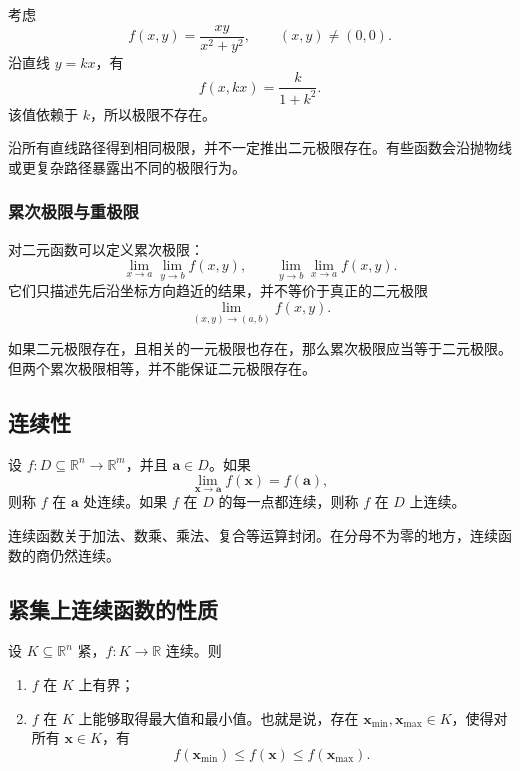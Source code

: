 \begin{example}
考虑
\[
    f(x,y)=\frac{xy}{x^2+y^2},\qquad (x,y)\neq(0,0).
\]
沿直线 $y=kx$，有
\[
    f(x,kx)=\frac{k}{1+k^2}.
\]
该值依赖于 $k$，所以极限不存在。
\end{example}

\begin{remark}
沿所有直线路径得到相同极限，并不一定推出二元极限存在。有些函数会沿抛物线或更复杂路径暴露出不同的极限行为。
\end{remark}

\subsubsection{累次极限与重极限}

对二元函数可以定义累次极限：
\[
    \lim_{x\to a}\lim_{y\to b}f(x,y),
    \qquad
    \lim_{y\to b}\lim_{x\to a}f(x,y).
\]
它们只描述先后沿坐标方向趋近的结果，并不等价于真正的二元极限
\[
    \lim_{(x,y)\to(a,b)}f(x,y).
\]

\begin{remark}
如果二元极限存在，且相关的一元极限也存在，那么累次极限应当等于二元极限。但两个累次极限相等，并不能保证二元极限存在。
\end{remark}

\subsection{连续性}

\begin{definition}[连续]
设 $f:D\subseteq\mathbb{R}^n\to\mathbb{R}^m$，并且 $\mathbf{a}\in D$。如果
\[
    \lim_{\mathbf{x}\to\mathbf{a}}f(\mathbf{x})=f(\mathbf{a}),
\]
则称 $f$ 在 $\mathbf{a}$ 处连续。如果 $f$ 在 $D$ 的每一点都连续，则称 $f$ 在 $D$ 上连续。
\end{definition}

\begin{property}
连续函数关于加法、数乘、乘法、复合等运算封闭。在分母不为零的地方，连续函数的商仍然连续。
\end{property}

\subsection{紧集上连续函数的性质}

\begin{theorem}
设 $K\subseteq\mathbb{R}^n$ 紧，$f:K\to\mathbb{R}$ 连续。则
\begin{enumerate}
    \item $f$ 在 $K$ 上有界；
    \item $f$ 在 $K$ 上能够取得最大值和最小值。也就是说，存在 $\mathbf{x}_{\min},\mathbf{x}_{\max}\in K$，使得对所有 $\mathbf{x}\in K$，有
    \[
        f(\mathbf{x}_{\min})\leq f(\mathbf{x})\leq f(\mathbf{x}_{\max}).
    \]
\end{enumerate}
\end{theorem}

